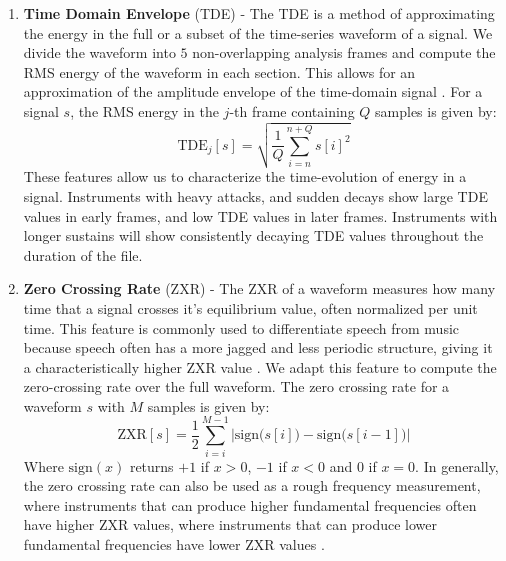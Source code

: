 \documentclass[conference,onecolumn,letterpaper]{IEEEtran}
\begin{document}
\begin{enumerate}

\item\textbf{Time Domain Envelope} (TDE) - 
The TDE is a method of approximating the energy in the full or a subset of the time-series waveform of a signal. We divide the waveform into $5$ non-overlapping analysis frames and compute the RMS energy of the waveform in each section. This allows for an approximation of the amplitude envelope of the time-domain signal \cite{Virtanen}. For a signal $s$, the RMS energy in the $j$-th frame containing $Q$ samples is given by:
\begin{equation}
    \label{eqn:TDE}
    \text{TDE}_j[s] = \sqrt{\frac{1}{Q}\sum_{i=n}^{n+Q}s[i]^2}
\end{equation}
These features allow us to characterize the time-evolution of energy in a signal. Instruments with heavy attacks, and sudden decays show large TDE values in early frames, and low TDE values in later frames. Instruments with longer sustains will show consistently decaying TDE values throughout the duration of the file.

\item\textbf{Zero Crossing Rate} (ZXR) - 
The ZXR of a waveform measures how many time that a signal crosses it's equilibrium value, often normalized per unit time. This feature is commonly used to differentiate speech from music because speech often has a more jagged and less periodic structure, giving it a characteristically higher ZXR value \cite{Virtanen,Khan,Zhang}. We adapt this feature to compute the zero-crossing rate over the full waveform. The zero crossing rate for a waveform $s$ with $M$ samples is given by:
\begin{equation}
    \label{eqn:ZXR}
    \text{ZXR}[s] = \frac{1}{2}\sum_{i=i}^{M-1}\Big| \text{sign}\big(s[i]\big) - \text{sign}\big(s[i-1]\big) \Big|
\end{equation}
Where $\text{sign}(x)$  returns $+1$ if $x > 0$, $-1$ if $x < 0$ and $0$ if $x = 0$. In generally, the zero crossing rate can also be used as a rough frequency measurement, where instruments that can produce higher fundamental frequencies often have higher ZXR values, where instruments that can produce lower fundamental frequencies have lower ZXR values \cite{Zhang}.


\end{enumerate}
\end{document}
